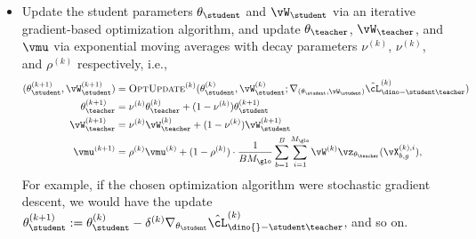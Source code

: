 \documentclass[../../book-main.tex]{subfiles}
\begin{document}
\begin{itemize}
    \begin{align}\label{eq:dino_loss_teacherstudent_empirical}
        &\hat{\cL}_{\dino{}-\student\teacher}^{(k)}(\theta_{\student}, \theta_{\teacher}, \vW_{\student}, \vW_{\teacher}, \vmu) :=
        \frac{1}{BM_{\glo}(M_{\glo} + M_{\loc} - 1)}\sum_{b = 1}^{B}\sum_{i = 1}^{M_{\glo}}\\
        &\Bigg[\sum_{j = 1}^{M_{\loc}}d_{\CE}(\vp_{\theta_{\teacher}, \vW_{\teacher}, \vmu}(\vX_{b, g}^{(k), i}), \vp_{\theta_{\student}, \vW_{\student}}(\vX_{b, \ell}^{(k), j})) + \sum_{\substack{j = 1 \\ j \neq i}}^{M_{\glo}}d_{\CE}(\vp_{\theta_{\teacher}, \vW_{\teacher}, \vmu}(\vX_{b, g}^{(k), i}), \vp_{\theta_{\student}, \vW_{\student}}(\vX_{b, g}^{(k), j}))\Bigg]\nonumber
    \end{align}
    as well as its gradients with respect to \(\theta_{\student}\) and \(\vW_{\student}\), which should be computed under the assumption that \(\theta_{\teacher}\), \(\vW_{\teacher}\), and \(\vmu\) are constants --- namely that they are \textit{detached from the computational graph} and not dependent on \(\theta_{\student}\) and \(\vW_{\student}\).
    \item Update the student parameters \(\theta_{\student}\) and \(\vW_{\student}\) via an iterative gradient-based optimization algorithm, and update \(\theta_{\teacher}\), \(\vW_{\teacher}\), and \(\vmu\) via exponential moving averages with decay parameters \(\nu^{(k)}\), \(\nu^{(k)}\), and \(\rho^{(k)}\) respectively, i.e., 
    \begin{align}
        (\theta_{\student}^{(k + 1)}, \vW_{\student}^{(k + 1)})
        &= \textsc{OptUpdate}^{(k)}(\theta_{\student}^{(k)}, \vW_{\student}^{(k)}; \nabla_{(\theta_{\student}, \vW_{\student})}\hat{\cL}_{\dino-\student\teacher}^{(k)}) \\
        \theta_{\teacher}^{(k + 1)}
        &= \nu^{(k)}\theta_{\teacher}^{(k)} + (1 - \nu^{(k)})\theta_{\student}^{(k + 1)} \\
        \vW_{\teacher}^{(k + 1)}
        &= \nu^{(k)}\vW_{\teacher}^{(k)} + (1 - \nu^{(k)})\vW_{\student}^{(k + 1)} \\
        \vmu^{(k + 1)}
        &= \rho^{(k)}\vmu^{(k)} + (1 - \rho^{(k)})\cdot\frac{1}{BM_{\glo}}\sum_{b = 1}^{B}\sum_{i = 1}^{M_{\glo}}\vW^{(k)}\vz_{\theta_{\teacher}}(\vX_{b, g}^{(k), i}),
    \end{align}
    For example, if the chosen optimization algorithm were stochastic gradient descent, we would have the update \(\theta_{\student}^{(k + 1)} := \theta_{\student}^{(k)} - \delta^{(k)}\nabla_{\theta_{\student}}\hat{\cL}_{\dino{}-\student\teacher}^{(k)}\), and so on.
\end{itemize}
\end{document}
